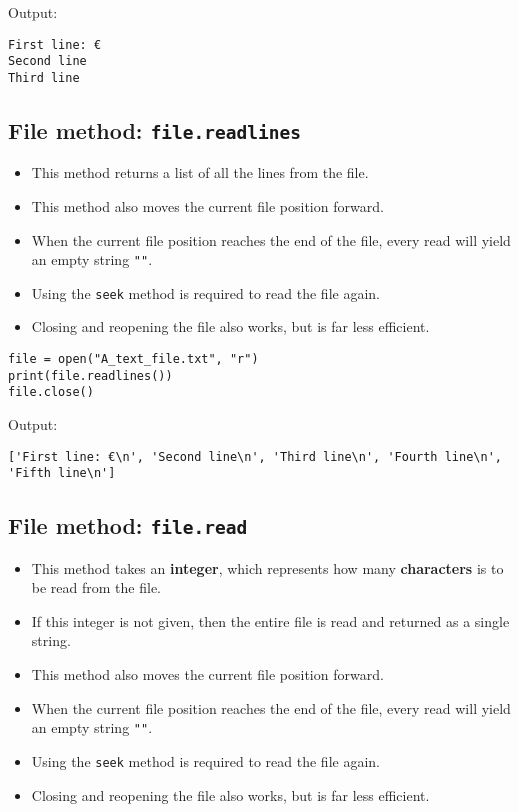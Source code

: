 \documentclass[11pt]{article}
\begin{document}
 \noindent Output:

\label{orga2641cb}
\begin{verbatim}
First line: €
Second line
Third line
\end{verbatim}


 \newpage
\subsection{File method: \texttt{file.readlines}}
\label{sec:org6360622}
\begin{itemize}
\item This method returns a list of all the lines from the file.
\item This method also moves the current file position forward.
\item When the current file position reaches the end of the file, every read will yield an empty string \texttt{""}.
\item Using the \texttt{seek} method is required to read the file again.
\item Closing and reopening the file also works, but is far less efficient.
\end{itemize}

\begin{verbatim}
file = open("A_text_file.txt", "r")
print(file.readlines())
file.close()
\end{verbatim}

 \noindent Output:

\label{orgb9663b2}
\begin{verbatim}
['First line: €\n', 'Second line\n', 'Third line\n', 'Fourth line\n', 'Fifth line\n']
\end{verbatim}


 \newpage
\subsection{File method: \texttt{file.read}}
\label{sec:org46d18a6}
\begin{itemize}
\item This method takes an \textbf{integer}, which represents how many \textbf{characters} is to be read from the file.
\item If this integer is not given, then the entire file is read and returned as a single string.
\item This method also moves the current file position forward.
\item When the current file position reaches the end of the file, every read will yield an empty string \texttt{""}.
\item Using the \texttt{seek} method is required to read the file again.
\item Closing and reopening the file also works, but is far less efficient.
\end{itemize}
\end{document}
